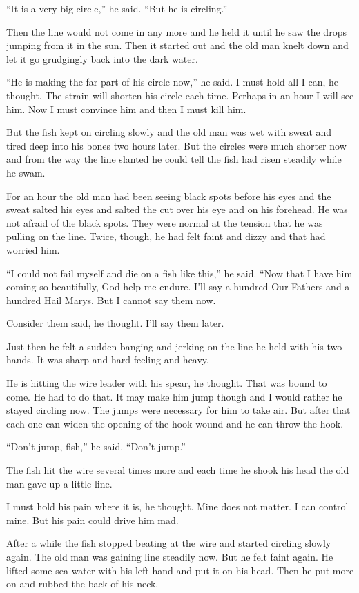 \documentclass[fontset=ubuntu]{ctexrep}
\newlength{\drop}%
\begin{document}
``It is a very big circle,'' he said. ``But he is circling.''

Then the line would not come in any more and he held it until he saw the
drops jumping from it in the sun. Then it started out and the old man \gls{knelt}
down and let it go \gls{grudgingly} back into the dark water.

``He is making the far part of his circle now,'' he said. I must hold all I
can, he thought. The strain will shorten his circle each time. Perhaps in an
hour I will see him. Now I must convince him and then I must kill him.

But the fish kept on circling slowly and the old man was wet with sweat and
tired deep into his bones two hours later. But the circles were much shorter
now and from the way the line slanted he could tell the fish had risen
steadily while he swam.

For an hour the old man had been seeing black spots before his eyes and the
sweat salted his eyes and salted the cut over his eye and on his forehead.
He was not afraid of the black spots. They were normal at the tension that
he was pulling on the line. Twice, though, he had felt faint and \gls{dizzy}
and that had worried him.

``I could not fail myself and die on a fish like this,'' he said. ``Now that
I have him coming so beautifully, God help me endure. I'll say a hundred Our
Fathers and a hundred Hail Marys. But I cannot say them now.

Consider them said, he thought. I'll say them later.

Just then he felt a sudden banging and jerking on the line he held with his
two hands. It was sharp and \gls{hard-feeling} and heavy.

He is hitting the wire leader with his \gls{spear}, he thought. That was
\gls{bound} to come. He had to do that. It may make him jump though and I
would rather he stayed circling now. The jumps were necessary for him to
take air. But after that each one can widen the opening of the hook \gls{wound}
and he can throw the hook.

``Don't jump, fish,'' he said. ``Don't jump.''

The fish hit the wire several times more and each time he \gls{shook} his
head the old man gave up a little line.

I must hold his pain where it is, he thought. Mine does not matter. I can
control mine. But his pain could drive him mad.

After a while the fish stopped beating at the wire and started circling
slowly again. The old man was gaining line steadily now. But he felt faint
again. He lifted some sea water with his left hand and put it on his head.
Then he put more on and rubbed the back of his neck.
\end{document}
